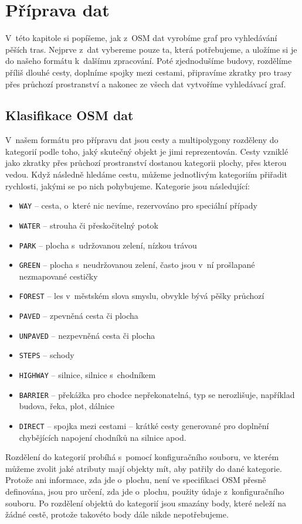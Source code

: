 \chapter{Příprava dat}
V~této kapitole si popíšeme, jak z~OSM dat vyrobíme graf pro vyhledávání pěších
tras. Nejprve z~dat vybereme pouze ta, která potřebujeme, a uložíme si je do
našeho formátu k~dalšímu zpracování. Poté zjednodušíme budovy, rozdělíme příliš
dlouhé cesty, doplníme spojky mezi cestami, připravíme zkratky pro trasy přes
průchozí prostranství a nakonec ze všech dat vytvoříme vyhledávací graf.

\section{Klasifikace OSM dat} \label{label:kategorie}
V~našem formátu pro přípravu dat jsou cesty a multipolygony rozděleny do
kategorií podle toho, jaký skutečný objekt je jimi reprezentován. Cesty vzniklé
jako zkratky přes průchozí prostranství dostanou kategorii plochy, přes kterou
vedou. Když následně hledáme cestu, můžeme jednotlivým kategoriím přiřadit
rychlosti, jakými se po nich pohybujeme. Kategorie jsou následující:
\begin{itemize}
	\item \verb|WAY| -- cesta, o~které nic nevíme, rezervováno pro speciální
	případy
	\item \verb|WATER| -- strouha či přeskočitelný potok
	\item \verb|PARK| -- plocha s~udržovanou zelení, nízkou trávou
	\item \verb|GREEN| -- plocha s~neudržovanou zelení, často jsou v~ní
	prošlapané nezmapované cestičky
	\item \verb|FOREST| -- les v~městském slova smyslu, obvykle bývá pěšky
	průchozí
	\item \verb|PAVED| -- zpevněná cesta či plocha
	\item \verb|UNPAVED| -- nezpevněná cesta či plocha
	\item \verb|STEPS| -- schody
	\item \verb|HIGHWAY| -- silnice, silnice s~chodníkem
	\item \verb|BARRIER| -- překážka pro chodce nepřekonatelná, typ se
	nerozlišuje, například budova, řeka, plot, dálnice
	\item \verb|DIRECT| -- spojka mezi cestami -- krátké cesty generované
	pro doplnění chybějících napojení chodníků na silnice apod.
\end{itemize}
Rozdělení do kategorií probíhá s~pomocí konfiguračního souboru, ve kterém můžeme
zvolit jaké atributy mají objekty mít, aby patřily do dané kategorie. Protože
ani informace, zda jde o~plochu, není ve specifikaci OSM přesně definována, jsou
pro určení, zda jde o~plochu, použity údaje z~konfiguračního souboru. Po
rozdělení objektů do kategorií jsou smazány body, které neleží na žádné cestě,
protože takovéto body dále nikde nepotřebujeme.

